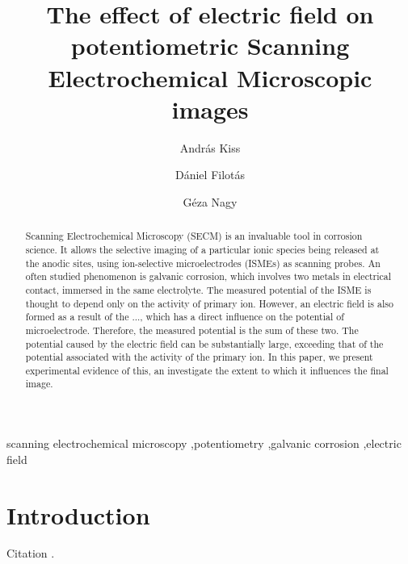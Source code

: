 \documentclass[3p]{elsarticle}
\begin{document}
\begin{frontmatter}

\title{The effect of electric field on potentiometric Scanning Electrochemical Microscopic images}
\author[akiss]{András Kiss}
\address[akiss, gnagy]{Department of General and Physical Chemistry, Faculty of Sciences, University of Pécs, 7624 Pécs, Ifjúság útja 6, Hungary}
\author[dfilotas]{Dániel Filotás}
\author[gnagy]{Géza Nagy}


\begin{abstract}

Scanning Electrochemical Microscopy (SECM) is an invaluable tool in corrosion science. It allows the selective imaging of a particular ionic species being released at the anodic sites, using ion-selective microelectrodes (ISMEs) as scanning probes. An often studied phenomenon is galvanic corrosion, which involves two metals in electrical contact, immersed in the same electrolyte. The measured potential of the ISME is thought to depend only on the activity of primary ion. However, an electric field is also formed as a result of the ..., which has a direct influence on the potential of microelectrode. Therefore, the measured potential is the sum of these two. The potential caused by the electric field can be substantially large, exceeding that of the potential associated with the activity of the primary ion. In this paper, we present experimental evidence of this, an investigate the extent to which it influences the final image. 
\end{abstract}
\begin{keyword}
	scanning electrochemical microscopy \sep potentiometry \sep galvanic corrosion \sep electric field
\end{keyword}
\end{frontmatter}

\section{Introduction}
Citation \cite{artefacts}.
\end{document}
